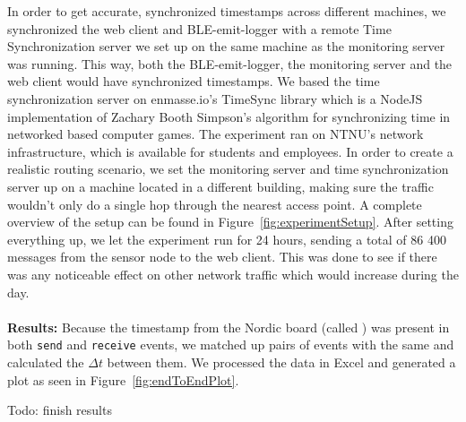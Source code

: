 In order to get accurate, synchronized timestamps across different machines, we synchronized the web client and BLE-emit-logger with a remote Time Synchronization server we set up on the same machine as the monitoring server was running. This way, both the BLE-emit-logger, the monitoring server and the web client would have synchronized timestamps. We based the time synchronization server on enmasse.io's TimeSync library\cite{timesync} which is a NodeJS implementation of Zachary Booth Simpson's algorithm for synchronizing time in networked based computer games\cite{timesync:algo}. The experiment ran on NTNU's network infrastructure, which is available for students and employees. In order to create a realistic routing scenario, we set the monitoring server and time synchronization server up on a machine located in a different building, making sure the traffic wouldn't only do a single hop through the nearest access point. A complete overview of the setup can be found in Figure~\ref{fig:experimentSetup}. After setting everything up, we let the experiment run for 24 hours, sending a total of 86 400 messages from the sensor node to the web client. This was done to see if there was any noticeable effect on other network traffic which would increase during the day.
\\
\\
\noindent
\textbf{Results:} 
Because the timestamp from the Nordic board (called ) was present in both \texttt{send} and \texttt{receive} events, we matched up pairs of events with the same  and calculated the $\Delta t$ between them. We processed the data in Excel and generated a plot as seen in Figure~\ref{fig:endToEndPlot}.

Todo: finish results


